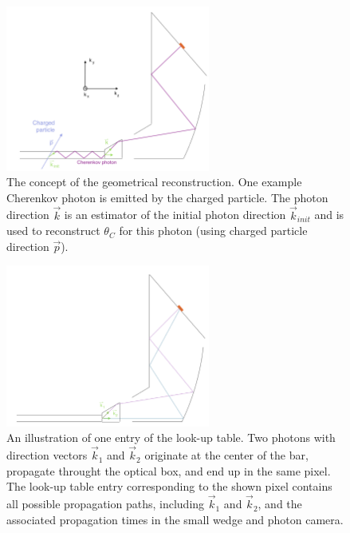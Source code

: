 \begin{figure}[!h]
\centering
\includegraphics[clip, trim=0.5cm 0.0cm 0cm 0.cm,width=0.6\textwidth]{pics/lut3.png}
\caption{\label{pic:lut1}
The concept of the geometrical reconstruction. One example Cherenkov photon is emitted by the charged particle. The photon direction $\vec k$ is an estimator of the initial photon direction $\vec k_{init}$ and is used to reconstruct $\theta_{C}$ for this photon (using charged particle direction $\vec p$). 
}
\end{figure}

\begin{figure}[!h]
\centering
\includegraphics[clip, trim=0.5cm 0.cm 0cm 0.cm,width=0.6\textwidth]{pics/lut1.png}
\caption{\label{pic:lut2}
An illustration of one entry of the look-up table. Two photons with direction vectors $\vec k_{1}$ and $\vec k_{2}$ originate at the center of the bar, propagate throught the optical box, and end up in the same pixel. The look-up table entry corresponding to the shown pixel contains all possible propagation paths, including $\vec k_{1}$ and $\vec k_{2}$, and the associated propagation times in the small wedge and photon camera.
}
\end{figure}

